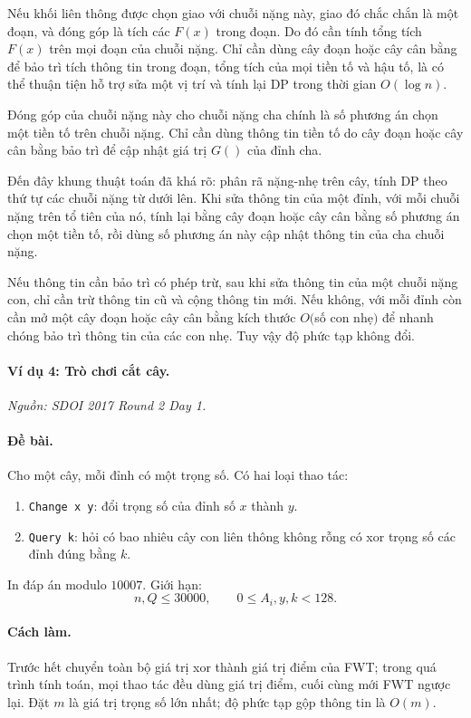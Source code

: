 \documentclass[11pt]{article}
\begin{document}
Nếu khối liên thông được chọn giao với chuỗi nặng này, giao đó chắc chắn là một
đoạn, và đóng góp là tích các \(F(x)\) trong đoạn. Do đó cần tính tổng tích
\(F(x)\) trên mọi đoạn của chuỗi nặng. Chỉ cần dùng cây đoạn hoặc cây cân bằng
để bảo trì tích thông tin trong đoạn, tổng tích của mọi tiền tố và hậu tố, là có
thể thuận tiện hỗ trợ sửa một vị trí và tính lại DP trong thời gian \(O(\log n)\).

Đóng góp của chuỗi nặng này cho chuỗi nặng cha chính là số phương án chọn một
tiền tố trên chuỗi nặng. Chỉ cần dùng thông tin tiền tố do cây đoạn hoặc cây cân
bằng bảo trì để cập nhật giá trị \(G()\) của đỉnh cha.

Đến đây khung thuật toán đã khá rõ: phân rã nặng-nhẹ trên cây, tính DP theo thứ
tự các chuỗi nặng từ dưới lên. Khi sửa thông tin của một đỉnh, với mỗi chuỗi
nặng trên tổ tiên của nó, tính lại bằng cây đoạn hoặc cây cân bằng số phương án
chọn một tiền tố, rồi dùng số phương án này cập nhật thông tin của cha chuỗi
nặng.

Nếu thông tin cần bảo trì có phép trừ, sau khi sửa thông tin của một chuỗi nặng
con, chỉ cần trừ thông tin cũ và cộng thông tin mới. Nếu không, với mỗi đỉnh còn
cần mở một cây đoạn hoặc cây cân bằng kích thước \(O(\)số con nhẹ\()\) để nhanh
chóng bảo trì thông tin của các con nhẹ. Tuy vậy độ phức tạp không đổi.

\paragraph{Ví dụ 4: Trò chơi cắt cây.}
\emph{Nguồn: SDOI 2017 Round 2 Day 1.}

\paragraph{Đề bài.}
Cho một cây, mỗi đỉnh có một trọng số. Có hai loại thao tác:
\begin{enumerate}
  \item \texttt{Change x y}: đổi trọng số của đỉnh số \(x\) thành \(y\).
  \item \texttt{Query k}: hỏi có bao nhiêu cây con liên thông không rỗng có xor
  trọng số các đỉnh đúng bằng \(k\).
\end{enumerate}
In đáp án modulo \(10007\). Giới hạn:
\[
  n,Q\le 30000,\qquad 0\le A_i,y,k<128 .
\]

\paragraph{Cách làm.}
Trước hết chuyển toàn bộ giá trị xor thành giá trị điểm của FWT; trong quá trình
tính toán, mọi thao tác đều dùng giá trị điểm, cuối cùng mới FWT ngược lại. Đặt
\(m\) là giá trị trọng số lớn nhất; độ phức tạp gộp thông tin là \(O(m)\).
\end{document}
